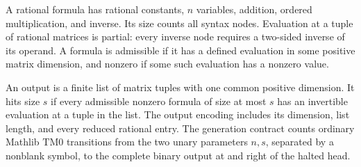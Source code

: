 \begin{definition}
  \label{def:rational-formula-evaluation}
  \leanok
  A rational formula has rational constants, $n$ variables, addition, ordered
  multiplication, and inverse. Its size counts all syntax nodes. Evaluation
  at a tuple of rational matrices is partial: every inverse node requires
  a two-sided inverse of its operand. A formula is admissible if it has a
  defined evaluation in some positive matrix dimension, and nonzero if some
  such evaluation has a nonzero value.
\end{definition}

\begin{definition}
  \label{def:rational-hitting-output}
  \leanok
  An output is a finite list of matrix tuples with one common positive
  dimension. It hits size $s$ if every admissible nonzero formula of size at
  most $s$ has an invertible evaluation at a tuple in the list. The output
  encoding includes its dimension, list length, and every reduced rational
  entry. The generation contract counts ordinary Mathlib $\mathrm{TM0}$
  transitions from the two unary parameters $n,s$, separated by a nonblank
  symbol, to the complete binary output at and right of the halted head.
\end{definition}

